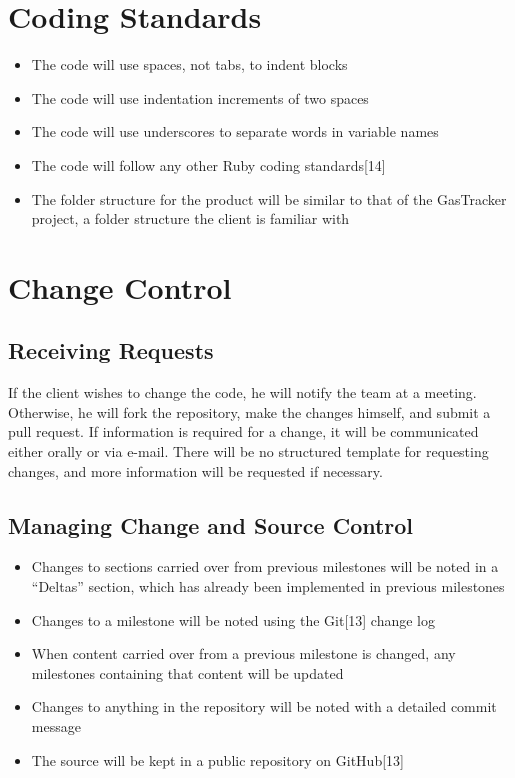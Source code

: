 \documentclass{article}
\begin{document}
\section{Coding Standards}
\begin{itemize}
\item The code will use spaces, not tabs, to indent blocks
\item The code will use indentation increments of two spaces
\item The code will use underscores to separate words in variable names
\item The code will follow any other Ruby coding standards[14]
\item The folder structure for the product will be similar to that of the GasTracker project, a folder structure the client is familiar with
\end{itemize}

\section{Change Control}

\subsection{Receiving Requests}
If the client wishes to change the code, he will notify the team at a meeting.  Otherwise, he will fork the repository, make the changes himself, and submit a pull request.  If information is required for a change, it will be communicated either orally or via e-mail.  There will be no structured template for requesting changes, and more information will be requested if necessary.

\subsection{Managing Change and Source Control}
\begin{itemize}
\item Changes to sections carried over from previous milestones will be noted in a ``Deltas'' section, which has already been implemented in previous milestones
\item Changes to a milestone will be noted using the Git[13] change log
\item When content carried over from a previous milestone is changed, any milestones containing that content will be updated
\item Changes to anything in the repository will be noted with a detailed commit message
\item The source will be kept in a public repository on GitHub[13]
\end{itemize}
\end{document}
